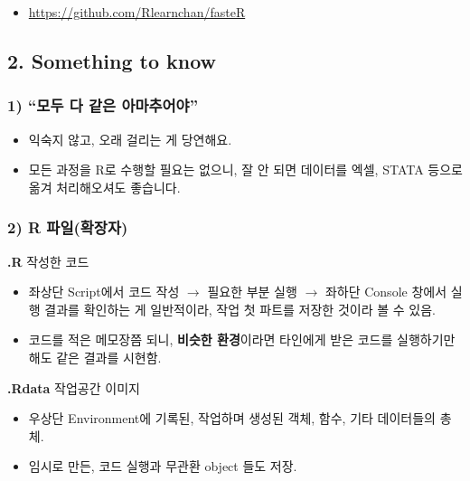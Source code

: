\documentclass[
  12,
]{article}
\providecommand{\tightlist}{%
  \setlength{\itemsep}{0pt}\setlength{\parskip}{0pt}}
\begin{document}
\begin{itemize}
\tightlist
\item
  \url{https://github.com/Rlearnchan/fasteR}
\end{itemize}

\hypertarget{something-to-know}{%
\subsection{2. Something to know}\label{something-to-know}}

\hypertarget{uxbaa8uxb450-uxb2e4-uxac19uxc740-uxc544uxb9c8uxcd94uxc5b4uxc57c}{%
\subsubsection{1) ``모두 다 같은
아마추어야''}\label{uxbaa8uxb450-uxb2e4-uxac19uxc740-uxc544uxb9c8uxcd94uxc5b4uxc57c}}

\begin{itemize}
\item
  익숙지 않고, 오래 걸리는 게 당연해요.
\item
  모든 과정을 R로 수행할 필요는 없으니, 잘 안 되면 데이터를 엑셀, STATA
  등으로 옮겨 처리해오셔도 좋습니다.
\end{itemize}

\hypertarget{r-uxd30cuxc77cuxd655uxc7a5uxc790}{%
\subsubsection{2) R
파일(확장자)}\label{r-uxd30cuxc77cuxd655uxc7a5uxc790}}

\textbf{.R} 작성한 코드

\begin{itemize}
\item
  좌상단 Script에서 코드 작성 \(\to\) 필요한 부분 실행 \(\to\) 좌하단
  Console 창에서 실행 결과를 확인하는 게 일반적이라, 작업 첫 파트를
  저장한 것이라 볼 수 있음.
\item
  코드를 적은 메모장쯤 되니, \textbf{비슷한 환경}이라면 타인에게 받은
  코드를 실행하기만 해도 같은 결과를 시현함.
\end{itemize}

\textbf{.Rdata} 작업공간 이미지

\begin{itemize}
\item
  우상단 Environment에 기록된, 작업하며 생성된 객체, 함수, 기타
  데이터들의 총체.
\item
  임시로 만든, 코드 실행과 무관환 object 들도 저장.
\end{itemize}
\end{document}
